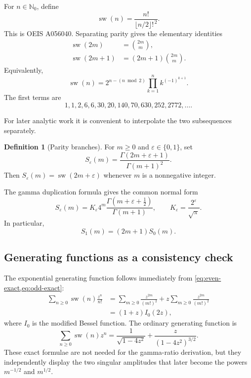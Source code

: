 \documentclass[11pt,a4paper]{article}
\theoremstyle{clean}
\theoremstyle{definition}
\newtheorem{definition}[theorem]{Definition}
\newcommand{\sw}{\operatorname{sw}}
\newcommand{\eps}{\varepsilon}
\newcommand{\N}{\mathbb N}
\begin{document}
For \(n\in\N_0\), define
\begin{equation}
 \sw(n)=\frac{n!}{\lfloor n/2\rfloor!^{\,2}}.
 \label{eq:swing-def}
\end{equation}
This is OEIS A056040.  Separating parity gives the elementary identities
\begin{align}
 \sw(2m)&=\binom{2m}{m},
 \label{eq:even-exact}\\
 \sw(2m+1)&=(2m+1)\binom{2m}{m}.
 \label{eq:odd-exact}
\end{align}
Equivalently,
\begin{equation}
 \sw(n)=2^{n-(n\bmod2)}\prod_{k=1}^n k^{(-1)^{k+1}}.
 \label{eq:swing-product}
\end{equation}
The first terms are
\[
 1,1,2,6,6,30,20,140,70,630,252,2772,\ldots.
\]

For later analytic work it is convenient to interpolate the two subsequences separately.

\begin{definition}[Parity branches]
For \(m\ge0\) and \(\eps\in\{0,1\}\), set
\begin{equation}
 S_\eps(m)=\frac{\Gamma(2m+\eps+1)}{\Gamma(m+1)^2}.
 \label{eq:S-def}
\end{equation}
Then \(S_\eps(m)=\sw(2m+\eps)\) whenever \(m\) is a nonnegative integer.
\end{definition}

The gamma duplication formula gives the common normal form
\begin{equation}
 S_\eps(m)=K_\eps4^m
 \frac{\Gamma(m+\eps+\tfrac12)}{\Gamma(m+1)},
 \qquad K_\eps=\frac{2^\eps}{\sqrt\pi}.
 \label{eq:duplication-normal-form}
\end{equation}
In particular,
\begin{equation}
 S_1(m)=(2m+1)S_0(m).
 \label{eq:branch-transfer-exact}
\end{equation}

\subsection{Generating functions as a consistency check}

The exponential generating function follows immediately from \cref{eq:even-exact,eq:odd-exact}:
\begin{align}
 \sum_{n\ge0}\sw(n)\frac{z^n}{n!}
 &=\sum_{m\ge0}\frac{z^{2m}}{(m!)^2}
   +z\sum_{m\ge0}\frac{z^{2m}}{(m!)^2} \\
 &=(1+z)I_0(2z),
 \label{eq:egf}
\end{align}
where \(I_0\) is the modified Bessel function.  The ordinary generating function is
\begin{equation}
 \sum_{n\ge0}\sw(n)z^n
 =\frac1{\sqrt{1-4z^2}}+\frac{z}{(1-4z^2)^{3/2}}.
 \label{eq:ogf}
\end{equation}
These exact formulae are not needed for the gamma-ratio derivation, but they independently display the two singular amplitudes that later become the powers \(m^{-1/2}\) and \(m^{1/2}\).
\end{document}
